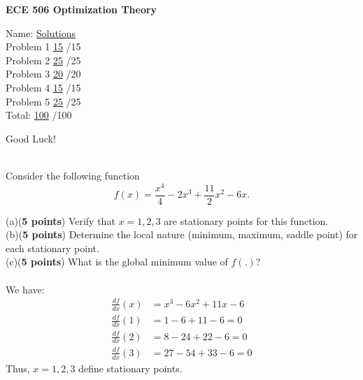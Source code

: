 \documentclass[12pt,legalpaper]{article}
\begin{document}
\vspace{2in}
\begin{center}
  {\Huge\bf ECE 506 Optimization Theory}
\end{center}
\vspace{0.5in}
%  
{\bf\large
\begin{flushleft}
 \hspace{0.3in} Name: \qquad \underline{Solutions}\\[0.5in]
 \hspace{1.5in}Problem 1 \underline{15} /15 \\[0.1in]
 \hspace{1.5in}Problem 2 \underline{25} /25 \\[0.1in]
 \hspace{1.5in}Problem 3 \underline{20} /20 \\[0.1in]
 \hspace{1.5in}Problem 4 \underline{15} /15 \\[0.1in]
 \hspace{1.5in}Problem 5 \underline{25} /25 \\[0.1in]
 \hspace{1.5in}Total: \phantom{\hspace{0.35 true in}} 
 \underline{100} /100
 \end{flushleft}}
\vspace{2in}
{\bf\Huge
\begin{center}
  Good Luck!
\end{center}}
\newpage

\\
\noindent Consider the following function
\begin{equation*}
  f(x) = \frac{x^4}{4} - 2 x^3 + \frac{11}{2}x^2 - 6 x.
\end{equation*}

(a)({\bf 5 points}) Verify that $x=1,2,3$ are stationary points for this function.\\
(b)({\bf 5 points}) Determine the local nature (minimum, maximum, saddle point) for each stationary point.\\
(c)({\bf 5 points}) What is the global minimum value of $f(.)$? \\

\\
We have:
\begin{align*}
   \frac{d f}{d x}(x) &= x^3 - 6 x^2 + 11 x - 6 \\
   \frac{d f}{d x}(1) &= 1-6+11-6 = 0 \\
   \frac{d f}{d x}(2) &= 8 - 24 + 22 - 6 = 0 \\
   \frac{d f}{d x}(3) &= 27 - 54 + 33 - 6 = 0 
\end{align*}
Thus, $x=1,2,3$ define stationary points.\\
\end{document}
